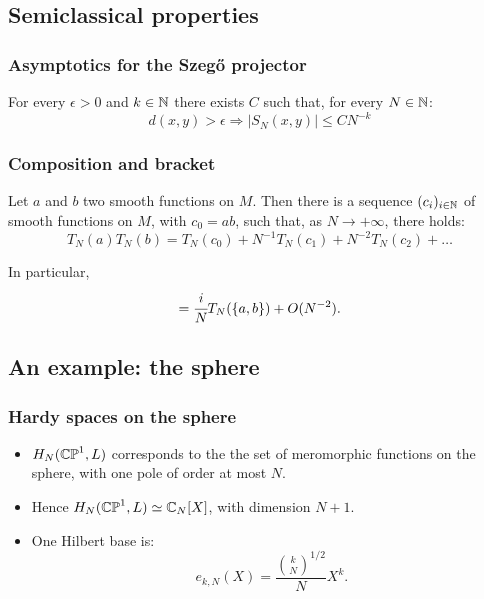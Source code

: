 \documentclass[mathserif]{beamer}
\begin{document}
\subsection{Semiclassical properties}
\begin{frame}\frametitle{Asymptotics for the Szeg\H{o} projector}
	\begin{prop}
		For every $\epsilon>0$ and $k\in \mathbb{N}$ there exists $C$
                such that, for every $N\in \mathbb{N}$:
		\begin{equation*}
			d(x,y)>\epsilon \Rightarrow |S_N(x,y)|\leq C N^{-k}
		\end{equation*}
	\end{prop}
\end{frame}

\begin{frame}\frametitle{Composition and bracket}
	\begin{prop}
          Let $a$ and $b$ two smooth functions on $M$. Then
          there is a sequence $(c_i)_{i\in \mathbb{N}}$ of smooth functions on
           $M$, with $c_0=ab$, such that, as $N\to +\infty$, there holds:
		\begin{equation*}
		T_N(a)T_N(b)=T_N(c_0)+N^{-1}T_N(c_1)+N^{-2}T_N(c_2)+\ldots
		\end{equation*}
		
		In particular,
		\begin{equation*}
		[T_N(a),T_N(b)]=\cfrac{i}{N}T_N(\{a,b\})+O(N^{-2}).
		\end{equation*}
	\end{prop}
\end{frame}
\subsection{An example: the sphere}
\begin{frame}\frametitle{Hardy spaces on the sphere}
	\begin{itemize}
	\item $H_N(\mathbb{CP}^1,L)$ corresponds to the the set of meromorphic
          functions on the sphere, with one pole of order at most $N$.
	
	\item Hence $H_N(\mathbb{CP}^1,L)\simeq \mathbb{C}_{N}[X]$, with dimension $N+1$.
	
	\item One Hilbert base is:
	$$e_{k,N}(X)=\frac{\binom{k}{N}^{1/2}}{N}X^k.$$
	\end{itemize}
\end{frame}
\end{document}
